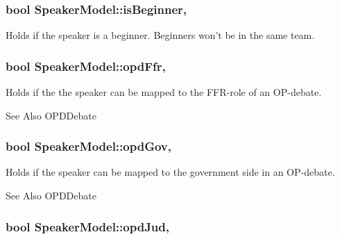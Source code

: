 \hypertarget{classSpeakerModel_a47d41be22317dd22fd7aec6240c731cf}{
\subsubsection[{is\-Beginner}]{\setlength{\rightskip}{0pt plus 5cm}bool Speaker\-Model\-::is\-Beginner\hspace{0.3cm}{\ttfamily [read]}, {\ttfamily [write]}}}\label{classSpeakerModel_a47d41be22317dd22fd7aec6240c731cf}
Holds if the speaker is a beginner. Beginners won't be in the same team. \hypertarget{classSpeakerModel_ae7ddef47cf54a9ace7c2399c7a18049d}{
\subsubsection[{opd\-Ffr}]{\setlength{\rightskip}{0pt plus 5cm}bool Speaker\-Model\-::opd\-Ffr\hspace{0.3cm}{\ttfamily [read]}, {\ttfamily [write]}}}\label{classSpeakerModel_ae7ddef47cf54a9ace7c2399c7a18049d}
Holds if the the speaker can be mapped to the F\-F\-R-\/role of an O\-P-\/debate. \begin{DoxySeeAlso}{See Also}
O\-P\-D\-Debate 
\end{DoxySeeAlso}
\hypertarget{classSpeakerModel_a7a7dafddf0d9f0bb60e5e138277b50fd}{
\subsubsection[{opd\-Gov}]{\setlength{\rightskip}{0pt plus 5cm}bool Speaker\-Model\-::opd\-Gov\hspace{0.3cm}{\ttfamily [read]}, {\ttfamily [write]}}}\label{classSpeakerModel_a7a7dafddf0d9f0bb60e5e138277b50fd}
Holds if the speaker can be mapped to the government side in an O\-P-\/debate. \begin{DoxySeeAlso}{See Also}
O\-P\-D\-Debate 
\end{DoxySeeAlso}
\hypertarget{classSpeakerModel_a427f9e7d98bcbaea06f395eb82271a56}{
\subsubsection[{opd\-Jud}]{\setlength{\rightskip}{0pt plus 5cm}bool Speaker\-Model\-::opd\-Jud\hspace{0.3cm}{\ttfamily [read]}, {\ttfamily [write]}}}\label{classSpeakerModel_a427f9e7d98bcbaea06f395eb82271a56}
